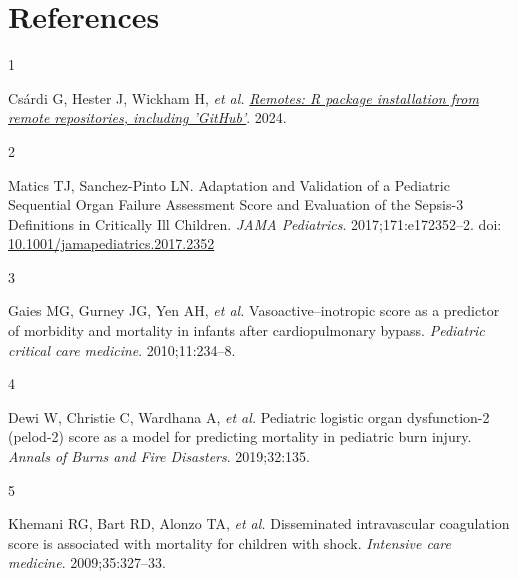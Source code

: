 \documentclass[
  letterpaper,
  DIV=11,
  numbers=noendperiod]{scrartcl}
\newlength{\cslhangindent}
\newlength{\csllabelwidth}
\newenvironment{CSLReferences}[2] %
 {\begin{list}{}{%
  \setlength{\itemindent}{0pt}
  \setlength{\leftmargin}{0pt}
  \setlength{\parsep}{0pt}
  \ifodd #1
   \setlength{\leftmargin}{\cslhangindent}
   \setlength{\itemindent}{-1\cslhangindent}
  \fi
  \setlength{\itemsep}{#2\baselineskip}}}
 {\end{list}}
\newcommand{\CSLLeftMargin}[1]{\parbox[t]{\csllabelwidth}{\strut#1\strut}}
\newcommand{\CSLRightInline}[1]{\parbox[t]{\linewidth - \csllabelwidth}{\strut#1\strut}}
\providecommand{\DIFaddbegin}{} %
\providecommand{\DIFaddend}{} %
\providecommand{\DIFdelbegin}{} %
\providecommand{\DIFdelend}{} %
\newcommand{\DIFscaledelfig}{0.5}
\newlength{\DIFdelgraphicswidth} %
\newlength{\DIFdelgraphicsheight} %
\newcommand{\DIFaddincludegraphics}[2][]{{\color{blue}\fbox{\DIFOincludegraphics[#1]{#2}}}} %
\newcommand{\DIFdelincludegraphics}[2][]{%
\sbox{\DIFdelgraphicsbox}{\DIFOincludegraphics[#1]{#2}}%
\settoboxwidth{\DIFdelgraphicswidth}{\DIFdelgraphicsbox} %
\settoboxtotalheight{\DIFdelgraphicsheight}{\DIFdelgraphicsbox} %
\scalebox{\DIFscaledelfig}{%
\parbox[b]{\DIFdelgraphicswidth}{\usebox{\DIFdelgraphicsbox}\\[-\baselineskip] \rule{\DIFdelgraphicswidth}{0em}}\llap{\resizebox{\DIFdelgraphicswidth}{\DIFdelgraphicsheight}{%
\setlength{\unitlength}{\DIFdelgraphicswidth}%
\begin{picture}(1,1)%
\thicklines\linethickness{2pt} %
{\color[rgb]{1,0,0}\put(0,0){\framebox(1,1){}}}%
{\color[rgb]{1,0,0}\put(0,0){\line( 1,1){1}}}%
{\color[rgb]{1,0,0}\put(0,1){\line(1,-1){1}}}%
\end{picture}%
}\hspace*{3pt}}} %
} %
\DeclareRobustCommand{\DIFaddbegin}{\DIFOaddbegin \let\includegraphics\DIFaddincludegraphics} %
\DeclareRobustCommand{\DIFaddend}{\DIFOaddend \let\includegraphics\DIFOincludegraphics} %
\DeclareRobustCommand{\DIFdelbegin}{\DIFOdelbegin \let\includegraphics\DIFdelincludegraphics} %
\DeclareRobustCommand{\DIFdelend}{\DIFOaddend \let\includegraphics\DIFOincludegraphics} %
\begin{document}
\section*{References}\label{references}

\label{refs}
\begin{CSLReferences}{0}{1}
\CSLLeftMargin{1 }%
\DIFdelbegin %
\DIFdelend \DIFaddbegin \CSLRightInline{Csárdi G, Hester J, Wickham H, \emph{et al.}
\emph{\href{https://CRAN.R-project.org/package=remotes}{Remotes: R
package installation from remote repositories, including 'GitHub'}}.
2024.}
\DIFaddend 

\CSLLeftMargin{2 }%
\DIFdelbegin %
\DIFdelend \DIFaddbegin \CSLRightInline{Matics TJ, Sanchez-Pinto LN. {Adaptation and Validation
of a Pediatric Sequential Organ Failure Assessment Score and Evaluation
of the Sepsis-3 Definitions in Critically Ill Children}. \emph{JAMA
Pediatrics}. 2017;171:e172352--2. doi:
\href{https://doi.org/10.1001/jamapediatrics.2017.2352}{10.1001/jamapediatrics.2017.2352}}
\DIFaddend 

\CSLLeftMargin{3 }%
\CSLRightInline{Gaies MG, Gurney JG, Yen AH, \emph{et al.}
Vasoactive--inotropic score as a predictor of morbidity and mortality in
infants after cardiopulmonary bypass. \emph{Pediatric critical care
medicine}. 2010;11:234--8.}

\CSLLeftMargin{4 }%
\CSLRightInline{Dewi W, Christie C, Wardhana A, \emph{et al.} Pediatric
logistic organ dysfunction-2 (pelod-2) score as a model for predicting
mortality in pediatric burn injury. \emph{Annals of Burns and Fire
Disasters}. 2019;32:135.}

\CSLLeftMargin{5 }%
\CSLRightInline{Khemani RG, Bart RD, Alonzo TA, \emph{et al.}
Disseminated intravascular coagulation score is associated with
mortality for children with shock. \emph{Intensive care medicine}.
2009;35:327--33.}


\end{CSLReferences}
\end{document}
